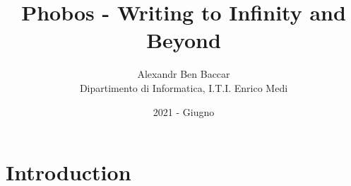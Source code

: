 \documentclass{article}
\title{Phobos - Writing to Infinity and Beyond}
\date{2021 - Giugno}
\author{Alexandr Ben Baccar\\ Dipartimento di Informatica, I.T.I. Enrico Medi}
\begin{document}
    \maketitle
    \section{Introduction}
    \label{sec: introduction}
    \blindtext
\end{document}
